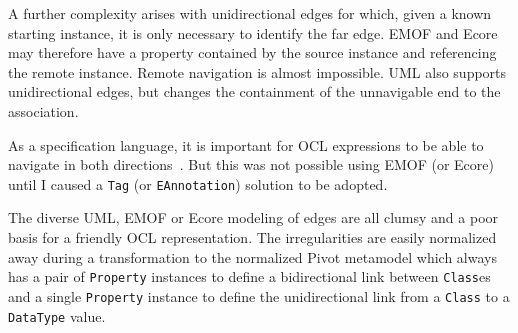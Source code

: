 \documentclass{jot}
\begin{document}
A further complexity arises with unidirectional edges for which, given a known starting instance, it is only necessary to identify the far edge. EMOF and Ecore may therefore have a property contained by the source instance and referencing the remote instance. Remote navigation is almost impossible. UML also supports unidirectional edges, but changes the containment of the unnavigable end to the association.

As a specification language, it is important for OCL expressions to be able to navigate in both directions~\cite{Willink-Opposites}. But this was not possible using EMOF (or Ecore) until I caused a \verb$Tag$ (or \verb$EAnnotation$) solution to be adopted.

The diverse UML, EMOF or Ecore modeling of edges are all clumsy and a poor basis for a friendly OCL representation. The irregularities are easily normalized away during a transformation to the normalized Pivot metamodel which always has a pair of \verb$Property$ instances to define a bidirectional link between \verb$Class$es and a single \verb$Property$ instance to define the unidirectional link from a \verb$Class$ to a \verb$DataType$ value.


\end{document}

